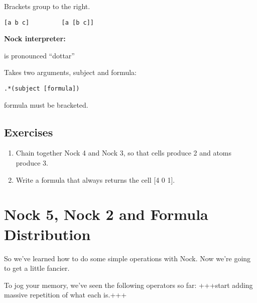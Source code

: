 Brackets group to the right.
\begin{framed_shaded}
\begin{Verbatim}[fontsize=\relsize{-2.5},commandchars=\\\{\}]
[a b c]         [a [b c]]
\end{Verbatim}
\end{framed_shaded}

\textbf{Nock interpreter:}

 is pronounced ``dottar''

Takes two arguments, subject and formula:
\begin{framed_shaded}
\begin{Verbatim}[fontsize=\relsize{-2.5},commandchars=\\\{\}]
.*(subject [formula])
\end{Verbatim}
\end{framed_shaded}
formula must be bracketed.

\subsection{Exercises}

\begin{enumerate}
\item Chain together Nock 4 and Nock 3, so that cells produce 2 and atoms produce 3.
\item Write a formula that always returns the cell [4 0 1].
\end{enumerate}

\section{Nock 5, Nock 2 and Formula Distribution}

\label{sec:nock_5_nock_2}

So we've learned how to do some simple operations with Nock. Now we're going to get a little fancier.

To jog your memory, we've seen the following operators so far: +++start adding massive repetition of what each  is.+++

